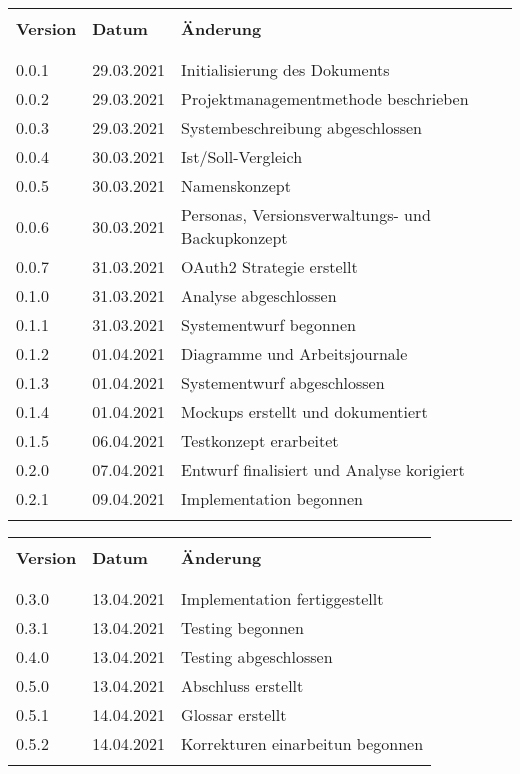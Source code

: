 \begin{table}[htp]
  \begin{tabularx}{\textwidth}{l l X}\hline \\
  \textbf{Version} & \textbf{Datum} & \textbf{Änderung} \\ \\\hline \\
  0.0.1 & 29.03.2021 & Initialisierung des Dokuments \\
  0.0.2 & 29.03.2021 & Projektmanagementmethode beschrieben \\
  0.0.3 & 29.03.2021 & Systembeschreibung abgeschlossen \\
  0.0.4 & 30.03.2021 & Ist/Soll-Vergleich \\
  0.0.5 & 30.03.2021 & Namenskonzept \\
  0.0.6 & 30.03.2021 & Personas, Versionsverwaltungs- und Backupkonzept \\
  0.0.7 & 31.03.2021 & OAuth2 Strategie erstellt \\
  0.1.0 & 31.03.2021 & Analyse abgeschlossen \\
  0.1.1 & 31.03.2021 & Systementwurf begonnen \\
  0.1.2 & 01.04.2021 & Diagramme und Arbeitsjournale \\
  0.1.3 & 01.04.2021 & Systementwurf abgeschlossen \\
  0.1.4 & 01.04.2021 & Mockups erstellt und dokumentiert \\
  0.1.5 & 06.04.2021 & Testkonzept erarbeitet \\
  0.2.0 & 07.04.2021 & Entwurf finalisiert und Analyse korigiert  \\
  0.2.1 & 09.04.2021 & Implementation begonnen  \\
  \\\hline
  \end{tabularx}
\end{table}
\pagebreak
\begin{table}[htp]
  \begin{tabularx}{\textwidth}{l l X}\hline \\
  \textbf{Version} & \textbf{Datum} & \textbf{Änderung} \\ \\\hline \\
  0.3.0 & 13.04.2021 & Implementation fertiggestellt  \\
  0.3.1 & 13.04.2021 & Testing begonnen  \\
  0.4.0 & 13.04.2021 & Testing abgeschlossen  \\
  0.5.0 & 13.04.2021 & Abschluss erstellt  \\
  0.5.1 & 14.04.2021 & Glossar erstellt  \\
  0.5.2 & 14.04.2021 & Korrekturen einarbeitun begonnen\\
  \\\hline
  \end{tabularx}
\end{table}

